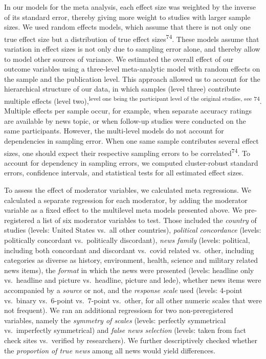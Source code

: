 \documentclass[
  man]{apa6}
\begin{document}
In our models for the meta analysis, each effect size was weighted by the inverse of its standard error, thereby giving more weight to studies with larger sample sizes. We used random effects models, which assume that there is not only one true effect size but a distribution of true effect sizes\textsuperscript{74}. These models assume that variation in effect sizes is not only due to sampling error alone, and thereby allow to model other sources of variance. We estimated the overall effect of our outcome variables using a three-level meta-analytic model with random effects on the sample and the publication level. This approach allowed us to account for the hierarchical structure of our data, in which samples (level three) contribute multiple effects (level two),\textsuperscript{level one being the participant level of the original studies, see 74}. Multiple effects per sample occur, for example, when separate accuracy ratings are available by news topic, or when follow-up studies were conducted on the same participants. However, the multi-level models do not account for dependencies in sampling error. When one same sample contributes several effect sizes, one should expect their respective sampling errors to be correlated\textsuperscript{74}. To account for dependency in sampling errors, we computed cluster-robust standard errors, confidence intervals, and statistical tests for all estimated effect sizes.

To assess the effect of moderator variables, we calculated meta regressions. We calculated a separate regression for each moderator, by adding the moderator variable as a fixed effect to the multilevel meta models presented above. We pre-registered a list of six moderator variables to test. Those included the \emph{country} of studies (levels: United States vs.~all other countries), \emph{political concordance} (levels: politically concordant vs.~politically discordant), \emph{news family} (levels: political, including both concordant and discordant vs.~covid related vs.~other, including categories as diverse as history, environment, health, science and military related news items), the \emph{format} in which the news were presented (levels: headline only vs.~headline and picture vs.~headline, picture and lede), whether news items were accompanied by a \emph{source} or not, and the \emph{response scale} used (levels: 4-point vs.~binary vs.~6-point vs.~7-point vs.~other, for all other numeric scales that were not frequent). We ran an additional regressiosn for two non-preregistered variables, namely the \emph{symmetry of scales} (levels: perfectly symmetrical vs.~imperfectly symmetrical) and \emph{false news selection} (levels: taken from fact check sites vs.~verified by researchers). We further descriptively checked whether the \emph{proportion of true news} among all news would yield differences.
\end{document}
